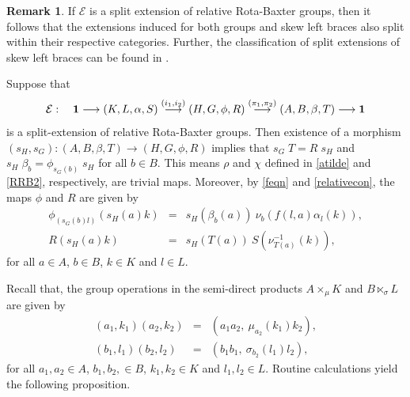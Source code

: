 \documentclass[11pt]{amsart}
\theoremstyle{thrm}
\theoremstyle{plain}
\theoremstyle{definition}
\newtheorem{remark}[equation]{Remark}
\numberwithin{equation}{section}
\begin{document}
\begin{remark}
If $\mathcal{E}$ is a split extension of relative Rota-Baxter groups, then it follows that the extensions induced for both groups and skew left braces also split within their respective categories. Further, the classification of split extensions of skew left braces can be found in \cite{N1}.
\end{remark}

Suppose that $$\mathcal{E} : \quad {\bf 1} \longrightarrow (K,L, \alpha,S ) \stackrel{(i_1, i_2)}{\longrightarrow}  (H,G, \phi, R) \stackrel{(\pi_1, \pi_2)}{\longrightarrow} (A,B, \beta, T) \longrightarrow {\bf 1}$$ is a split-extension of relative Rota-Baxter groups. Then existence of a morphism $(s_H, s_G): (A, B, \beta, T) \rightarrow (H, G, \phi, R)$ implies that $s_G \; T = R \;  s_H$ and $s_H \; \beta_b = \phi_{s_G(b)} \; s_H$ for all $b \in B$. This means $\rho$ and $\chi$ defined in \eqref{atilde} and \eqref{RRB2}, respectively, are trivial maps. Moreover, by \eqref{feqn} and \eqref{relativecon}, the maps $\phi$ and $R$ are given by
\begin{eqnarray*}
\phi_{(s_G(b)l)}(s_H(a)k) &=&s_H(\beta_b(a)) ~\nu_b(f(l,a)\alpha_l(k)),\\
R(s_H(a)k) &=& s_H(T(a)) ~S(\nu^{-1}_{T(a)}(k)),
\end{eqnarray*}
for all $a \in A$, $b \in B$, $k \in K$ and $l \in L$. 
\par 
Recall that,  the group operations in the semi-direct products $A \times_{\mu} K$ and $B \ltimes_{\sigma} L$ are given by
\begin{eqnarray*}
	(a_1,k_1) (a_2, k_2) &=&(a_1 a_2, ~\mu_{a_2}(k_1)k_2),\\
	(b_1,l_1) (b_2, l_2) &= & (b_1 b_1, ~\sigma_{b_2}(l_1)l_2),
\end{eqnarray*}
for all $a_1, a_2 \in A$, $b_1, b_2, \in B$, $k_1, k_2 \in K$ and $l_1, l_2 \in L$. Routine calculations yield the following proposition.
\end{document}
